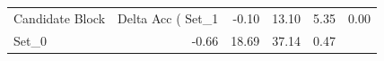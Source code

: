 \begin{tabular}{lrrrr}
\toprule
Candidate Block & Delta Acc (%
\midrule
Set_1 & -0.10 & 13.10 & 5.35 & 0.00 \\
Set_0 & -0.66 & 18.69 & 37.14 & 0.47 \\
\bottomrule
\end{tabular}
